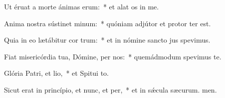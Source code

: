 \item Ut éruat a morte ánimas erum:~* et alat os in me.
\item Anima nostra sústinet minum:~* quóniam adjútor et protor ter est.
\item Quia in eo lætábitur cor trum:~* et in nómine sancto jus spevimus.
\item Fiat misericórdia tua, Dómine, per nos:~* quemádmodum spevimus  te.
\item Glória Patri, et lio,~* et Spitui to.
\item Sicut erat in princípio, et nunc, et per,~* et in sǽcula sæcurum. men.
